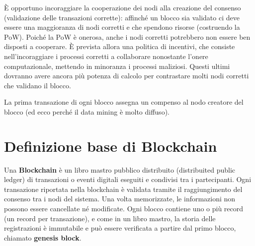 È opportuno incoraggiare la cooperazione dei nodi alla creazione del consenso (validazione delle transazioni corrette): affinché un blocco sia validato ci deve essere una maggioranza di nodi corretti e che spendono risorse (costruendo la PoW). Poiché la PoW è onerosa, anche i nodi corretti potrebbero non essere ben disposti a cooperare. È prevista allora una politica di incentivi, che consiste nell'incoraggiare i processi corretti a collaborare nonostante l'onere computazionale, mettendo in minoranza i processi maliziosi. Questi ultimi dovranno avere ancora più potenza di calcolo per contrastare molti nodi corretti che validano il blocco.

La prima transazione di ogni blocco assegna un compenso al nodo creatore del blocco (ed ecco perché il data mining è molto diffuso).

\section{Definizione base di Blockchain}
Una \textbf{Blockchain} è un libro mastro pubblico distribuito (distribuited public ledger) di transazioni o eventi digitali eseguiti e condivisi tra i partecipanti. Ogni transazione riportata nella blockchain è validata tramite il raggiungimento del consenso tra i nodi del sistema. Una volta memorizzate, le informazioni non possono essere cancellate né modificate. Ogni blocco contiene uno o più record (un record per transazione), e come in un libro mastro, la storia delle registrazioni è immutabile e può essere verificata a partire dal primo blocco, chiamato \textbf{genesis block}. 


